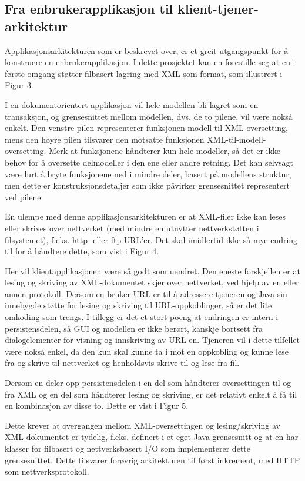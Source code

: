 \documentclass[a4paper]{scrartcl}
\begin{document}
\subsection{Fra enbrukerapplikasjon til klient-tjener-arkitektur}

Applikasjonsarkitekturen som er beskrevet over, er et greit utgangspunkt for å konstruere en enbrukerapplikasjon. I dette prosjektet kan en forestille seg at en i første omgang støtter filbasert lagring med XML som format, som illustrert i Figur 3.

I en dokumentorientert applikasjon vil hele modellen bli lagret som en transaksjon, og grensesnittet mellom modellen, dvs. de to pilene, vil være nokså enkelt. Den venstre pilen representerer funksjonen modell-til-XML-oversetting, mens den høyre pilen tilsvarer den motsatte funksjonen XML-til-modell-oversetting. Merk at funksjonene håndterer kun hele modeller, så det er ikke behov for å oversette delmodeller i den ene eller andre retning. Det kan selvsagt være lurt å bryte funksjonene ned i mindre deler, basert på modellens struktur, men dette er konstruksjonsdetaljer som ikke påvirker grensesnittet representert ved pilene.

En ulempe med denne applikasjonsarkitekturen er at XML-filer ikke kan leses eller skrives over nettverket (med mindre en utnytter nettverkstøtten i filsystemet), f.eks. http- eller ftp-URL’er. Det skal imidlertid ikke så mye endring til for å håndtere dette, som vist i Figur 4.

Her vil klientapplikasjonen være så godt som uendret. Den eneste forskjellen er at lesing og skriving av XML-dokumentet skjer over nettverket, ved hjelp av en eller annen protokoll. Dersom en bruker URL-er til å adressere tjeneren og Java sin innebygde støtte for lesing og skriving til URL-oppkoblinger, så er det lite omkoding som trengs. I tillegg er det et stort poeng at endringen er intern i persistensdelen, så GUI og modellen er ikke berørt, kanskje bortsett fra dialogelementer for visning og innskriving av URL-en.
Tjeneren vil i dette tilfellet være nokså enkel, da den kun skal kunne ta i mot en oppkobling og kunne lese fra og skrive til nettverket og henholdsvis skrive til og lese fra fil.

Dersom en deler opp persistensdelen i en del som håndterer oversettingen til og fra XML og en del som håndterer lesing og skriving, er det relativt enkelt å få til en kombinasjon av disse to. Dette er vist i Figur 5.

Dette krever at overgangen mellom XML-oversettingen og lesing/skriving av XML-dokumentet er tydelig, f.eks. definert i et eget Java-grensesnitt og at en har klasser for filbasert og nettverksbasert I/O som implementerer dette grensesnittet. Dette tilsvarer forøvrig arkitekturen til først inkrement, med HTTP som nettverksprotokoll.
\end{document}

